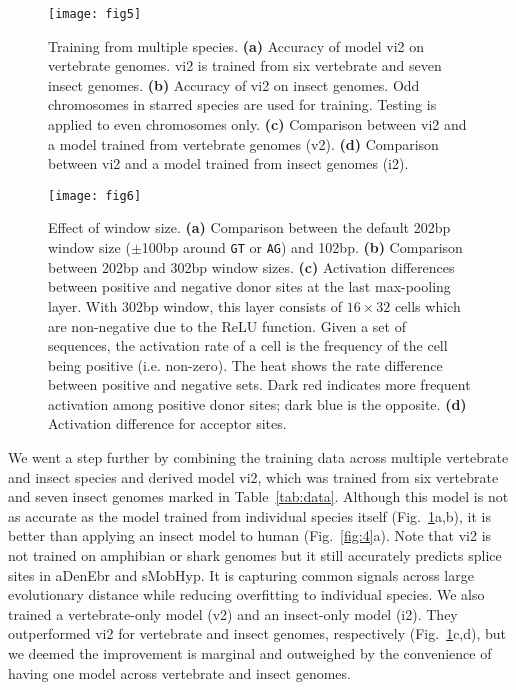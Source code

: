 \documentclass[webpdf,contemporary,large,namedate]{oup-authoring-template}%
\begin{document}
\begin{figure}[tb]
\texttt{[image: fig5]}
\caption{Training from multiple species.
{\bf (a)} Accuracy of model vi2 on vertebrate genomes. vi2 is trained from six vertebrate and seven insect genomes.
{\bf (b)} Accuracy of vi2 on insect genomes. Odd chromosomes in starred species are used for training.
Testing is applied to even chromosomes only.
{\bf (c)} Comparison between vi2 and a model trained from vertebrate genomes (v2).
{\bf (d)} Comparison between vi2 and a model trained from insect genomes (i2).}\label{fig:5}
\end{figure}

\begin{figure}[bt]
\texttt{[image: fig6]}
\caption{Effect of window size.
{\bf (a)} Comparison between the default 202bp window size ($\pm$100bp around {\tt GT} or {\tt AG}) and 102bp.
{\bf (b)} Comparison between 202bp and 302bp window sizes.
{\bf (c)} Activation differences between positive and negative donor sites at the last max-pooling layer.
With 302bp window, this layer consists of $16\times32$ cells which are non-negative due to the ReLU function.
Given a set of sequences, the activation rate of a cell is the frequency of the cell being positive (i.e. non-zero).
The heat shows the rate difference between positive and negative sets.
Dark red indicates more frequent activation among positive donor sites; dark blue is the opposite.
{\bf (d)} Activation difference for acceptor sites.}\label{fig:6}
\end{figure}

We went a step further by combining the training data across multiple vertebrate and insect species
and derived model vi2, which was trained from six vertebrate and seven insect genomes marked in Table~\ref{tab:data}.
Although this model is not as accurate as the model trained from individual species itself (Fig.~\ref{fig:5}a,b),
it is better than applying an insect model to human (Fig.~\ref{fig:4}a).
Note that vi2 is not trained on amphibian or shark genomes but it still accurately predicts splice sites in aDenEbr and sMobHyp.
It is capturing common signals across large evolutionary distance while reducing overfitting to individual species.
We also trained a vertebrate-only model (v2) and an insect-only model (i2).
They outperformed vi2 for vertebrate and insect genomes, respectively (Fig.~\ref{fig:5}c,d),
but we deemed the improvement is marginal and outweighed by the convenience
of having one model across vertebrate and insect genomes.
\end{document}
